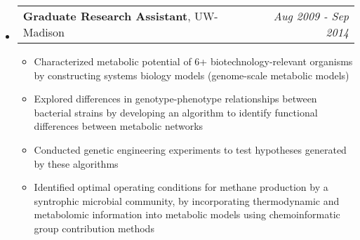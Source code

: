 \documentclass[letterpaper,10pt]{article}
\makeatletter
\newcommand{\ressubheadingSingular}[2]{
\begin{tabular*}{7in}{l@{\cftdotfill{\cftsecdotsep}\extracolsep{\fill}}r}
		#1 & \textit{#2} \\
\end{tabular*}\vspace{-6pt}}
\makeatother
\begin{document}
\begin{itemize}
\begin{itemize}
		\end{itemize}
	\item
		\ressubheadingSingular{\textbf{Graduate Research Assistant}, UW-Madison}{Aug 2009 - Sep 2014}		
		\begin{itemize}
			\item Characterized metabolic potential of 6+ biotechnology-relevant organisms by constructing systems biology models (genome-scale metabolic models)
			\item Explored differences in genotype-phenotype relationships between bacterial strains by developing an algorithm to identify functional differences between metabolic networks
			\item Conducted genetic engineering experiments to test hypotheses generated by these algorithms
			\item Identified optimal operating conditions for methane production by a syntrophic microbial community, by incorporating thermodynamic and metabolomic information into metabolic models using chemoinformatic group contribution methods
		\end{itemize}
\end{itemize}

\newpage
\end{document}
